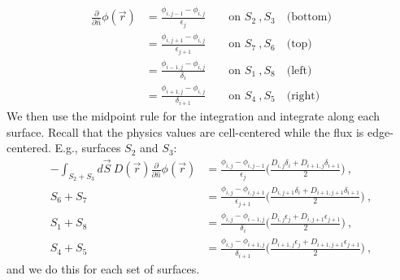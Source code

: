 \documentclass[12pt, answers]{exam}
\begin{document}
\begin{align}
\frac{\partial}{\partial \hat{n}}\phi(\vec{r}) &= \frac{\phi_{i,j-1} - \phi_{i,j}}{\epsilon_j} \qquad \text{on } S_2 \:, S_3 \quad \text{(bottom)} \nonumber \\
%
&= \frac{\phi_{i,j+1} - \phi_{i,j}}{\epsilon_{j+1}} \qquad \text{on } S_7 \:, S_6 \quad \text{(top)} \nonumber \\
%
&= \frac{\phi_{i-1,j} - \phi_{i,j}}{\delta_{i}} \qquad \text{on } S_1 \:, S_8 \quad \text{(left)} \nonumber \\
%
&= \frac{\phi_{i+1,j} - \phi_{i,j}}{\delta_{i+1}} \qquad \text{on } S_4 \:, S_5 \quad \text{(right)} \nonumber 
\end{align}
%
We then use the midpoint rule for the integration and integrate along each surface. Recall that the physics values are cell-centered while the flux is edge-centered. E.g., surfaces $S_2$ and $S_3$:
%
\begin{align*}
-\int_{S_2+S_3} d\vec{S} \:D(\vec{r})\frac{\partial}{\partial \hat{n}}\phi(\vec{r}) &= \boxed{\frac{\phi_{i,j} - \phi_{i,j-1}}{\epsilon_{j}} \biggl(\frac{D_{i,j} \delta_{i} + D_{i+1,j} \delta_{i+1}}{2}\biggr)}\:,\\
%
S_6+S_7 &= \boxed{\frac{\phi_{i,j} - \phi_{i,j+1}}{\epsilon_{j+1}} \biggl(\frac{D_{i,j+1} \delta_{i} + D_{i+1,j+1} \delta_{i+1}}{2}\biggr)}\:,\\
%
S_1+S_8 &= \boxed{\frac{\phi_{i,j} - \phi_{i-1,j}}{\delta_{i}} \biggl(\frac{D_{i,j} \epsilon_{j} + D_{i,j+1} \epsilon_{j+1}}{2}\biggr)}\:,\\
%
S_4+S_5 &= \boxed{\frac{\phi_{i,j} - \phi_{i+1,j}}{\delta_{i+1}} \biggl(\frac{D_{i+1,j} \epsilon_{j} + D_{i+1,j+1} \epsilon_{j+1}}{2}\biggr)}\:,
\end{align*}
%
and we do this for each set of surfaces. 


\end{document}
